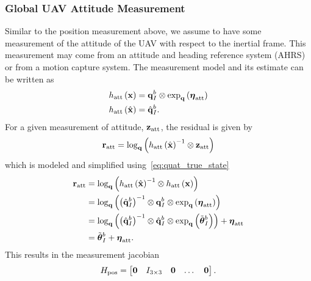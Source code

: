 \subsubsection{Global UAV Attitude Measurement}
Similar to the position measurement above, we assume to have some measurement of
the attitude of the UAV with respect to the inertial frame. This measurement may
come from an attitude and heading reference system (AHRS) or from a motion
capture system. 
The measurement model and its estimate can
be written as
\begin{align}
  h_{\text{att}} \left( \boldsymbol{\mathrm{x}} \right) &= \boldsymbol{\mathrm{q}}_{I}^b \otimes \exp_{\boldsymbol{\mathrm{q}}} \left(
  \boldsymbol{\mathrm{\eta}}_{\text{att}} \right) \\
    h_{\text{att}} \left( \hat{\boldsymbol{\mathrm{x}}} \right) &= \hat{\boldsymbol{\mathrm{q}}}_{I}^b.
\end{align}
For a given measurement of attitude, $\boldsymbol{\mathrm{z}}_{\text{att}}$, the residual is
given by
\begin{equation*}
  \boldsymbol{\mathrm{r}}_{\text{att}} = \log_{\boldsymbol{\mathrm{q}}} \left(  h_{\text{att}} \left(
  \hat{\boldsymbol{\mathrm{x}}} \right)^{-1} \otimes \boldsymbol{\mathrm{z}}_{\text{att}} \right)
\end{equation*}
which is modeled and simplified using~\eqref{eq:quat_true_state}
\begin{align*}
  \boldsymbol{\mathrm{r}}_{\text{att}} &= \log_{\boldsymbol{\mathrm{q}}} \left(  h_{\text{att}} \left(
  \hat{\boldsymbol{\mathrm{x}}} \right)^{-1} \otimes h_{\text{att}} \left( \boldsymbol{\mathrm{x}} \right) \right) \\
                        &= \log_{\boldsymbol{\mathrm{q}}} \left(  \left(
  \hat{\boldsymbol{\mathrm{q}}}_{I}^b \right)^{-1} \otimes \boldsymbol{\mathrm{q}}_{I}^b \otimes \exp_{\boldsymbol{\mathrm{q}}} \left(
  \boldsymbol{\mathrm{\eta}}_{\text{att}} \right)\right) \\
                        &= \log_{\boldsymbol{\mathrm{q}}} \left(  \left(
                        \hat{\boldsymbol{\mathrm{q}}}_{I}^b \right)^{-1} \otimes
                        \hat{\boldsymbol{\mathrm{q}}}_{I}^b \otimes \exp_{\boldsymbol{\mathrm{q}}} \left(
                      \tilde{\boldsymbol{\mathrm{\theta}}}_I^b \right) \right)
                          + \boldsymbol{\mathrm{\eta}}_{\text{att}}  \\
                        &= \tilde{\boldsymbol{\mathrm{\theta}}}_I^b
                          + \boldsymbol{\mathrm{\eta}}_{\text{att}}. 
\end{align*}
This results in the measurement jacobian
\begin{equation*}
  H_{\text{pos}} =
  \begin{bmatrix}
    \boldsymbol{\mathrm{0}} & I_{3 \times 3} & \boldsymbol{\mathrm{0}} & \dots & \boldsymbol{\mathrm{0}}
  \end{bmatrix}.
\end{equation*}

